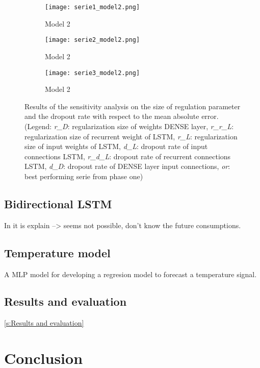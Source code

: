 \begin{figure}[ht]
	\centering
	\begin{subfigure}{0.49\linewidth}
		\texttt{[image: serie1\_model2.png]}
		\caption{Model 2}
	\end{subfigure}	
	\begin{subfigure}{0.49\linewidth}
		\texttt{[image: serie2\_model2.png]}
		\caption{Model 2}
	\end{subfigure}
	\begin{subfigure}{0.5\linewidth}
		\texttt{[image: serie3\_model2.png]}
		\caption{Model 2}
	\end{subfigure}
	\caption{Results of the sensitivity analysis on the size of regulation parameter and the dropout rate with respect to the mean absolute error.(Legend: \textit{r\_D}: regularization size of weights DENSE layer,  \textit{r\_r\_L}: regularization size of recurrent weight of LSTM, \textit{r\_L}: regularization size of input weights of LSTM, \textit{d\_L}: dropout rate of input connections LSTM, \textit{r\_d\_L}: dropout rate of recurrent connections LSTM, \textit{d\_D}: dropout rate of DENSE layer input connections, \textit{or}: best performing serie from phase one)}
	\label{fig:sensitivity_model2}
\end{figure}





\subsection{Bidirectional LSTM}
In \cite{Teuwen2019} it is explain --> seems not possible, don't know the future consumptions.


\subsection{Temperature model}
A MLP model for developing a regresion model to forecast a temperature signal. 

\subsection{Results and evaluation}\ref{s:Results and evaluation}




\section{Conclusion}


